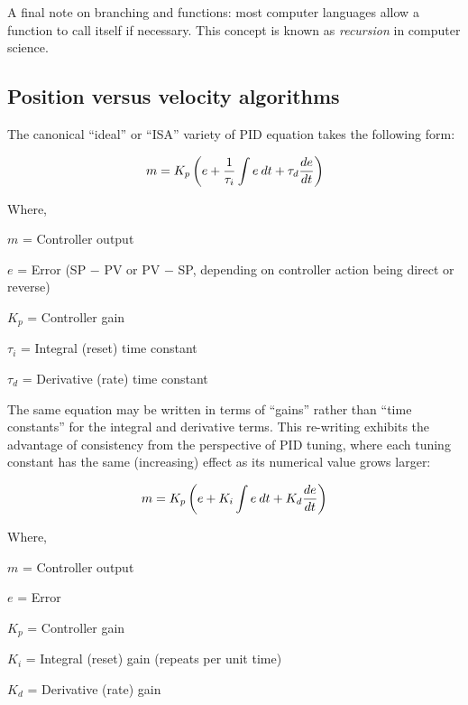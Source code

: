 \vskip 10pt

A final note on branching and functions: most computer languages allow a function to call itself if necessary.  This concept is known as \textit{recursion} in computer science.  





\filbreak
\subsection{Position versus velocity algorithms}

The canonical ``ideal'' or ``ISA'' variety of PID equation takes the following form:    

$$m = K_p \left(e + {1 \over \tau_i} \int e \> dt + \tau_d {de \over dt} \right)$$

\noindent
Where,

$m$ = Controller output

$e$ = Error (SP $-$ PV or PV $-$ SP, depending on controller action being direct or reverse)

$K_p$ = Controller gain

$\tau_i$ = Integral (reset) time constant

$\tau_d$ = Derivative (rate) time constant

\vskip 30pt

The same equation may be written in terms of ``gains'' rather than ``time constants'' for the integral and derivative terms.  This re-writing exhibits the advantage of consistency from the perspective of PID tuning, where each tuning constant has the same (increasing) effect as its numerical value grows larger:

$$m = K_p \left(e + K_i \int e \> dt + K_d {de \over dt} \right)$$

\noindent
Where,

$m$ = Controller output

$e$ = Error 

$K_p$ = Controller gain

$K_i$ = Integral (reset) gain (repeats per unit time)

$K_d$ = Derivative (rate) gain

\vskip 10pt

\filbreak

